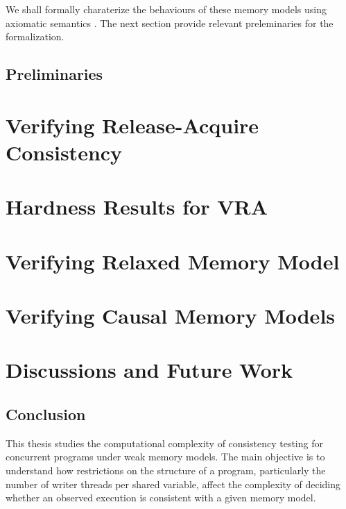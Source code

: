 \documentclass[12pt,a4paper]{report}
\begin{document}
We shall formally charaterize the behaviours of these memory models using axiomatic semantics \cite{Margalit:2021:POPL}\cite{Lahav2021}\cite{Tunc2023}. The next section provide relevant preleminaries for the formalization.
 
\section{Preliminaries} 



\chapter{Verifying Release-Acquire Consistency}\label{RA-ptime}
 
 
\chapter{Hardness Results for VRA}\label{RA-hard}
 
%
\chapter{Verifying Relaxed Memory Model} \label{Relaxed}
 

\newtheorem{definition}{Definition}
\chapter{Verifying Causal Memory Models}
  

 
%
 
\chapter{Discussions and Future Work}

\section{Conclusion}

This thesis studies the computational complexity of consistency testing for concurrent programs under weak memory models. The main objective is to understand how restrictions on the structure of a program, particularly the number of writer threads per shared variable, affect the complexity of deciding whether an observed execution is consistent with a given memory model.
\end{document}
